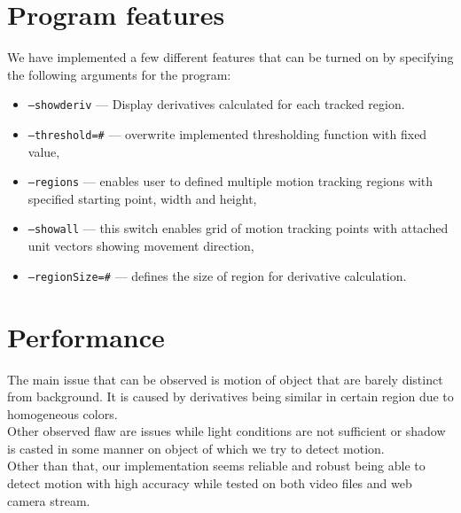 \documentclass[12pt,a4paper,twocolumn]{article}
\begin{document}
\section*{Program features}
We have implemented a few different features that can be turned on by specifying the following arguments for the program:
\begin{itemize}
\item \texttt{--showderiv} --- Display derivatives calculated for each tracked region.
\item \texttt{--threshold=\textit{\#}} --- overwrite implemented thresholding function with fixed value,
\item \texttt{--regions} --- enables user to defined multiple motion tracking regions with specified starting point, width and height,
\item \texttt{--showall} --- this switch enables grid of motion tracking points with attached unit vectors showing movement direction,
\item \texttt{--regionSize=\textit{\#}} --- defines the size of region for derivative calculation.
\end{itemize}

\section*{Performance}
The main issue that can be observed is motion of object that are barely distinct from background. It is caused by derivatives being similar in certain region due to homogeneous colors.\\
Other observed flaw are issues while light conditions are not sufficient or shadow is casted in some manner on object of which we try to detect motion.\\

Other than that, our implementation seems reliable and robust being able to detect motion with high accuracy while tested on both video files and web camera stream.
\end{document}
